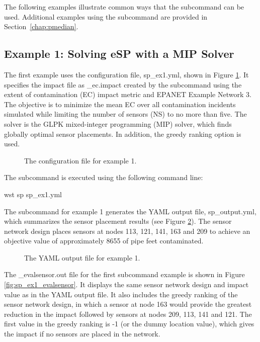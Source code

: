 The following examples illustrate common ways that the  subcommand can be used. 
Additional examples using the  subcommand are provided in Section~\ref{chap:pmedian}.

\subsection{Example 1: Solving eSP with a MIP Solver}
\label{sp_example1}

The first example uses the configuration file, sp\_ex1.yml, shown in Figure \ref{fig:sp_ex1}.
It specifies the impact file as {\outputprefix}\_ec.impact created by the  subcommand 
using the extent of contamination (EC) impact metric and EPANET Example Network 3. 
The objective is to minimize the mean EC over all contamination incidents 
simulated while limiting the number of sensors (NS) to no more than five. 
The solver is the GLPK mixed-integer programming (MIP) solver, 
which finds globally optimal sensor placements. In addition, the greedy ranking 
option is used.

\begin{figure}[h]
  \caption{The  configuration file for example 1.}
  \label{fig:sp_ex1}
\end{figure}

The  subcommand is executed using the following command line:

\begin{unknownListing}
wst sp sp_ex1.yml
\end{unknownListing}

The  subcommand for example 1 generates the YAML output file, {\outputprefix}sp\_output.yml, 
which summarizes the sensor placement results (see Figure \ref{fig:sp_ex1_yml}). 
The sensor network design places sensors at nodes 113, 121, 141, 163 and 209 to achieve 
an objective value of approximately 8655 of pipe feet contaminated.  

\begin{figure}[h]
  \caption{The  YAML output file for example 1.}
  \label{fig:sp_ex1_yml}
\end{figure}

The {\outputprefix}\_evalsensor.out file for the first  subcommand example is 
shown in Figure \ref{fig:sp_ex1_evalsensor}. It displays the 
same sensor network design and impact value as in the YAML output file. 
It also includes the greedy ranking of the sensor network design, in which
a sensor at node 163 would provide the greatest reduction in the impact 
followed by sensors at nodes 209, 113, 141 and 121. The first value in the 
greedy ranking is -1 (or the dummy location value), which gives the impact if no 
sensors are placed in the network.


